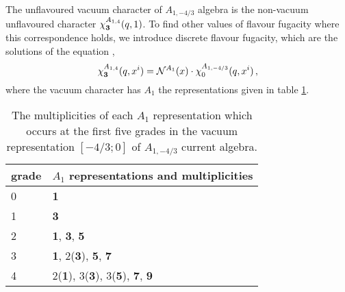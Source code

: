 \documentclass[a4paper,12pt]{article}
\begin{document}
%
The unflavoured vacuum character of $A_{1,-4/3}$ algebra is the non-vacuum unflavoured character $\chi_{\bf 3}^{A_{1,4}}(q,1)$. To find other values of flavour fugacity where this correspondence holds, we introduce discrete flavour fugacity, which are the solutions of the equation \cite{Buican:2019huq},
\begin{equation}\label{A_1_discrete_fugacities}
    \chi_{\bf 3}^{A_{1,4}}(q,x^i)=\mathcal{N}^{A_1}(x)\cdot\chi_{0}^{A_{1,-4/3}}(q,x^i)\, ,
\end{equation}
where the vacuum character has $A_1$ the representations given in table \ref{table: A_1-43_reps}.

\begin{table}
\centering
\begin{tabular}{ |p{2cm}|p{8cm}|  }
\hline
grade & $A_ 1$ representations and multiplicities \\
\hline
0 & {\bf 1} \\
\hline
1 &  {\bf 3} \\
\hline
2 & {\bf 1}, {\bf 3}, {\bf 5}\\
\hline
3 & {\bf 1}, 2({\bf 3}), {\bf 5}, {\bf 7}\\
\hline
4 & 2({\bf 1}), 3({\bf 3}), 3({\bf 5}), {\bf 7}, {\bf 9}\\
\hline
\end{tabular}
\caption{The multiplicities of each $A_1$ representation which occurs at the first five grades in the vacuum representation $[-4/3;0]$ of $A_{1,-4/3}$ current algebra.}
\label{table: A_1-43_reps}
\end{table}
\end{document}

